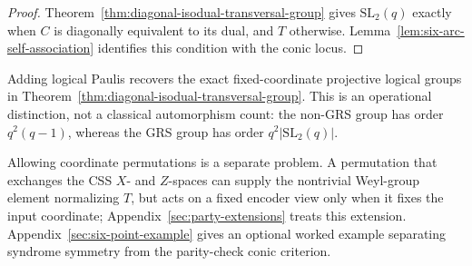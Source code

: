 \begin{proof}
Theorem~\ref{thm:diagonal-isodual-transversal-group} gives
\(\mathrm{SL}_2(q)\) exactly when \(C\) is diagonally equivalent to its dual,
and \(T\) otherwise.  Lemma~\ref{lem:six-arc-self-association} identifies
this condition with the conic locus.
\end{proof}

Adding logical Paulis recovers the exact fixed-coordinate projective logical
groups in Theorem~\ref{thm:diagonal-isodual-transversal-group}.  This is an
operational distinction, not a classical automorphism count: the non-GRS
group has order \(q^2(q-1)\), whereas the GRS group has order
\(q^2\lvert\mathrm{SL}_2(q)\rvert\).

Allowing coordinate permutations is a separate problem.  A permutation that
exchanges the CSS \(X\)- and \(Z\)-spaces can supply the nontrivial Weyl-group
element normalizing \(T\), but acts on a fixed encoder view only when it fixes
the input coordinate; Appendix~\ref{sec:party-extensions} treats this
extension.  Appendix~\ref{sec:six-point-example} gives an optional worked
example separating syndrome symmetry from the parity-check conic criterion.
